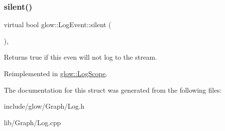 \mbox{\label{structglow_1_1_log_event_acca8974ed27e0896a63af715ec912fa1}} 
\subsubsection{\texorpdfstring{silent()}{silent()}}
{\footnotesize\ttfamily virtual bool glow\+::\+Log\+Event\+::silent (\begin{DoxyParamCaption}{ }\end{DoxyParamCaption})\hspace{0.3cm}{\ttfamily [inline]}, {\ttfamily [virtual]}}

\begin{DoxyReturn}{Returns}
true if this even will not log to the stream. 
\end{DoxyReturn}


Reimplemented in \hyperlink{structglow_1_1_log_scope_a4e7568406d6fec066b79bee89d0a9d1a}{glow\+::\+Log\+Scope}.



The documentation for this struct was generated from the following files\+:\begin{DoxyCompactItemize}
\item 
include/glow/\+Graph/Log.\+h\item 
lib/\+Graph/Log.\+cpp\end{DoxyCompactItemize}
